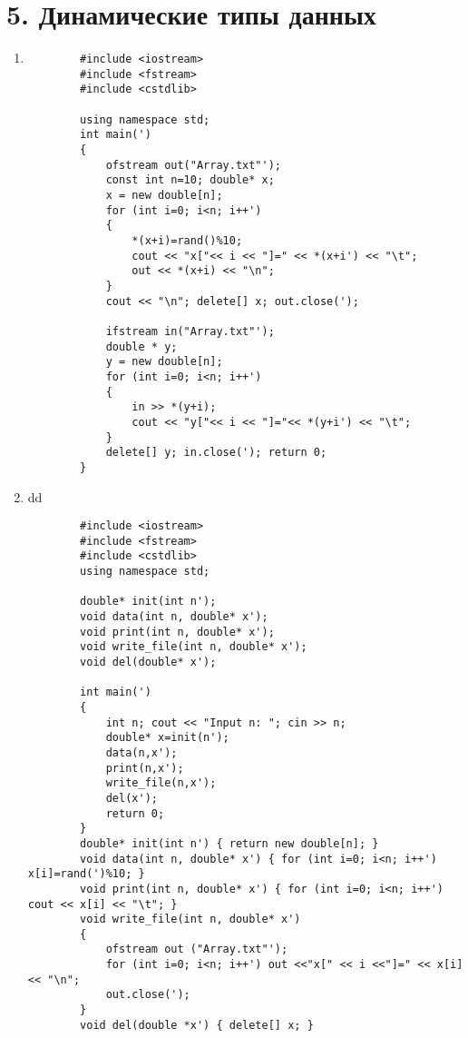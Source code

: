 \section*{5. Динамические типы данных}
\begin{enumerate}[leftmargin=*]
    \item \begin{lstlisting}
        #include <iostream>
        #include <fstream>
        #include <cstdlib>
    
        using namespace std;
        int main(')
        {
            ofstream out("Array.txt"');
            const int n=10; double* x;
            x = new double[n];
            for (int i=0; i<n; i++')
            {
                *(x+i)=rand()%10;
                cout << "x["<< i << "]=" << *(x+i') << "\t";
                out << *(x+i) << "\n";
            }
            cout << "\n"; delete[] x; out.close(');
    
            ifstream in("Array.txt"');
            double * y;
            y = new double[n];
            for (int i=0; i<n; i++')
            {
                in >> *(y+i);
                cout << "y["<< i << "]="<< *(y+i') << "\t";
            }
            delete[] y; in.close('); return 0;
        }
    \end{lstlisting}
    \setcounter{enumi}{5}
    \item \mbox{}dd \begin{lstlisting}
        #include <iostream>
        #include <fstream>
        #include <cstdlib>
        using namespace std;
    
        double* init(int n');
        void data(int n, double* x');
        void print(int n, double* x');
        void write_file(int n, double* x');
        void del(double* x');
    
        int main(')
        {
            int n; cout << "Input n: "; cin >> n;
            double* x=init(n');
            data(n,x');
            print(n,x');
            write_file(n,x');
            del(x');
            return 0;
        }
        double* init(int n') { return new double[n]; }
        void data(int n, double* x') { for (int i=0; i<n; i++') x[i]=rand(')%10; }
        void print(int n, double* x') { for (int i=0; i<n; i++') cout << x[i] << "\t"; }
        void write_file(int n, double* x')
        {
            ofstream out ("Array.txt"');
            for (int i=0; i<n; i++') out <<"x[" << i <<"]=" << x[i] << "\n";
            out.close(');
        }
        void del(double *x') { delete[] x; }
    \end{lstlisting}
\end{enumerate}

